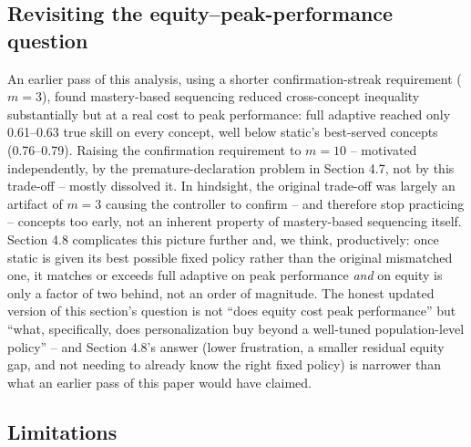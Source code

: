 \documentclass[11pt]{article}
\begin{document}
\subsection{Revisiting the equity--peak-performance question}

An earlier pass of this analysis, using a shorter confirmation-streak requirement ($m{=}3$), found mastery-based sequencing reduced cross-concept inequality substantially but at a real cost to peak performance: full adaptive reached only 0.61--0.63 true skill on every concept, well below static's best-served concepts (0.76--0.79). Raising the confirmation requirement to $m{=}10$ -- motivated independently, by the premature-declaration problem in Section 4.7, not by this trade-off -- mostly dissolved it. In hindsight, the original trade-off was largely an artifact of $m{=}3$ causing the controller to confirm -- and therefore stop practicing -- concepts too early, not an inherent property of mastery-based sequencing itself. Section 4.8 complicates this picture further and, we think, productively: once static is given its best possible fixed policy rather than the original mismatched one, it matches or exceeds full adaptive on peak performance \textit{and} on equity is only a factor of two behind, not an order of magnitude. The honest updated version of this section's question is not ``does equity cost peak performance'' but ``what, specifically, does personalization buy beyond a well-tuned population-level policy'' -- and Section 4.8's answer (lower frustration, a smaller residual equity gap, and not needing to already know the right fixed policy) is narrower than what an earlier pass of this paper would have claimed.

\subsection{Limitations}
\end{document}
